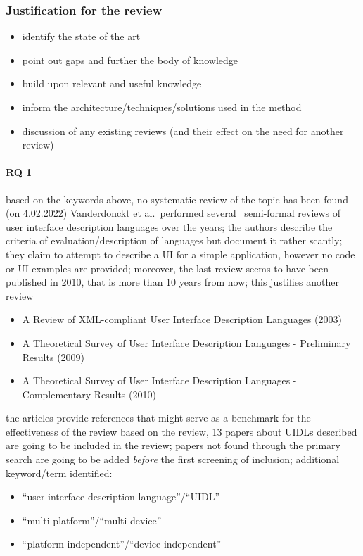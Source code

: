 \subsubsection[Justification]{Justification for the review}
\begin{itemize}
    \item identify the state of the art
    \item point out gaps and further the body of knowledge
    \item build upon relevant and useful knowledge
    \item inform the architecture/techniques/solutions used in the method
    \item discussion of any existing reviews (and their effect on the need for another review)
\end{itemize}

\paragraph{RQ 1}
based on the keywords above, no systematic review of the topic has been found (on 4.02.2022)
Vanderdonckt et al.\ performed several~\cite{souchon_review_2003,guerrero_garcia_theoretical_2009,guerrero_garcia_theoretical_2011} semi-formal reviews of
user interface description languages over the years;
the authors describe the criteria of evaluation/description of languages but document it rather scantly;
they claim to attempt to describe a UI for a simple application, however no code or UI examples are provided;
moreover, the last review seems to have been published in 2010, that is more than 10 years from now;
this justifies another review

\begin{itemize}
    \item A Review of XML-compliant User Interface Description Languages (2003)
    \item A Theoretical Survey of User Interface Description Languages - Preliminary Results (2009)
    \item A Theoretical Survey of User Interface Description Languages - Complementary Results (2010)
\end{itemize}

the articles provide references that might serve as a benchmark for the effectiveness of the review 
based on the review, 13 papers about UIDLs 
described are going to be included in the review;
papers not found through the primary search are going to be added \emph{before} the first screening of inclusion;
additional keyword/term identified:
\begin{itemize}
    \item \enquote{user interface description language}/\enquote{UIDL}
    \item \enquote{multi-platform}/\enquote{multi-device}
    \item \enquote{platform-independent}/\enquote{device-independent}
\end{itemize}

